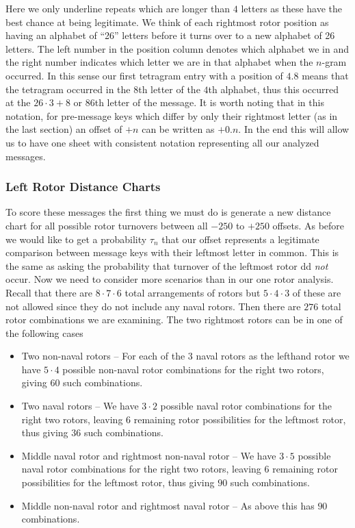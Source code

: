 \noindent Here we only underline repeats which are longer than $4$ letters as these have the best chance at being legitimate. We think of each rightmost rotor position as having an alphabet of ``26'' letters before it turns over to a new alphabet of 26 letters. The left number in the position column denotes which alphabet we in and the right number indicates which letter we are in that alphabet when the $n$-gram occurred. In this sense our first tetragram entry with a position of $4.8$ means that the tetragram occurred in the $8$th letter of the $4$th alphabet, thus this occurred at the $26\cdot3 + 8$ or $86$th letter of the message. It is worth noting that in this notation, for pre-message keys which differ by only their rightmost letter (as in the last section) an offset of $+n$ can be written as $+0.n$. In the end this will allow us to have one sheet with consistent notation representing all our analyzed messages.

\subsubsection{Left Rotor Distance Charts}
To score these messages the first thing we must do is generate a new distance chart for all possible rotor turnovers between all $-250$ to $+250$ offsets. As before we would like to get a probability $\tau_n$ that our offset represents a legitimate comparison between message keys with their leftmost letter in common. This is the same as asking the probability that turnover of the leftmost rotor dd \emph{not} occur. Now we need to consider more scenarios than in our one rotor analysis. Recall that there are $8\cdot7\cdot6$ total arrangements of rotors but $5\cdot4\cdot3$ of these are not allowed since they do not include any naval rotors. Then there are $276$ total rotor combinations we are examining. The two rightmost rotors can be in one of the following cases
\begin{itemize}
	\item Two non-naval rotors -- For each of the $3$ naval rotors as the lefthand rotor we have $5\cdot4$ possible non-naval rotor combinations for the right two rotors, giving $60$ such combinations.
	\item Two naval rotors --  We have $3\cdot2$ possible naval rotor combinations for the right two rotors, leaving $6$ remaining rotor possibilities for the leftmost rotor, thus giving $36$ such combinations.
	\item Middle naval rotor and rightmost non-naval rotor --  We have $3\cdot5$ possible naval rotor combinations for the right two rotors, leaving $6$ remaining rotor possibilities for the leftmost rotor, thus giving $90$ such combinations.
	\item Middle non-naval rotor and rightmost naval rotor --  As above this has $90$ combinations.
\end{itemize}

